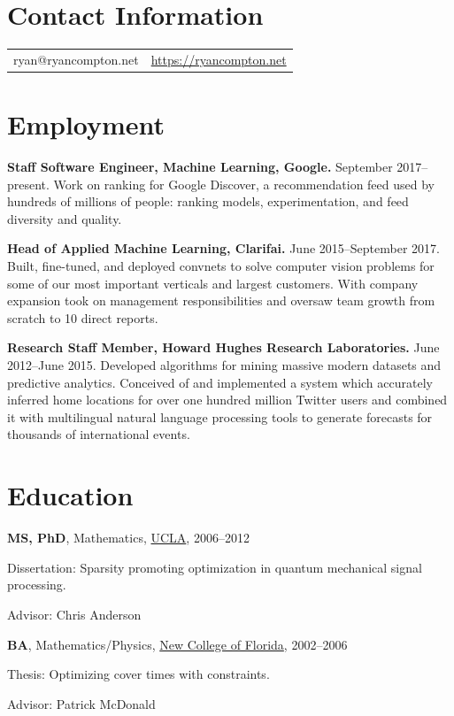 \documentclass[margin,line]{res}
\newenvironment{list1}{
  \begin{list}{\ding{113}}{%
      \setlength{\itemsep}{0.0in}
      \setlength{\parsep}{0in} \setlength{\parskip}{0in}
      \setlength{\topsep}{0in} \setlength{\partopsep}{0in}
      \setlength{\leftmargin}{0.17in}}}{\end{list}}
\begin{document}

\begin{resume}
\section{\sc Contact Information}
\vspace{.05in}
\begin{tabular}{@{}p{2in}p{2.8in}}
    ryan@ryancompton.net   &  \url{https://ryancompton.net} \\
\end{tabular}
\vspace{.1in}

\section{\sc Employment}

    {\bf Staff Software Engineer, Machine Learning, Google.} September 2017--present. Work on ranking for Google Discover, a recommendation feed used by hundreds of millions of people: ranking models, experimentation, and feed diversity and quality.
    
    {\bf Head of Applied Machine Learning, Clarifai.} June 2015--September 2017. Built, fine-tuned, and deployed convnets to solve computer vision problems for some of our most important verticals and largest customers. With company expansion took on management responsibilities and oversaw
team growth from scratch to 10 direct reports.

    {\bf Research Staff Member, Howard Hughes Research Laboratories.} June 2012--June 2015. Developed algorithms for mining massive modern datasets and predictive analytics. Conceived of and implemented a system which accurately inferred home locations for over one hundred million Twitter users and combined it with multilingual natural language processing tools to generate forecasts for thousands of international events.

\section{\sc Education}
    {\bf MS, PhD}, Mathematics, \href{https://ww3.math.ucla.edu/}{UCLA}, 2006--2012\\
\vspace*{-.1in}
\begin{list1}
\item [] Dissertation: Sparsity promoting optimization in quantum mechanical signal processing.
\item [] Advisor: Chris Anderson
\end{list1}
    {\bf BA}, Mathematics/Physics, \href{https://en.wikipedia.org/wiki/New_College_of_Florida}{New College of Florida}, 2002--2006\\
\vspace*{-.1in}
\begin{list1}
\item [] Thesis: Optimizing cover times with constraints.
\item [] Advisor: Patrick McDonald
\end{list1}


\end{resume}
\end{document}
